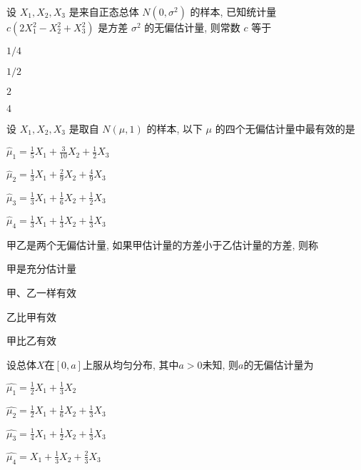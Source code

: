 \documentclass{exam-zh}
\begin{document}
\begin{question}
  设 $X_1, X_2, X_3$ 是来自正态总体 $N(0, \sigma^2)$ 的样本, 已知统计量 $c(2X_1^2 - X_2^2 + X_3^2)$ 是方差 $\sigma^2$ 的无偏估计量, 则常数 $c$ 等于 \paren[B]
  
  \begin{choices}
    \item $1/4$
    \item $1/2$
    \item $2$
    \item $4$
  \end{choices}
\end{question}

\begin{question}
  设 $X_1, X_2, X_3$ 是取自 $N(\mu, 1)$ 的样本, 以下 $\mu$ 的四个无偏估计量中最有效的是 \paren[D]
  
  \begin{choices}
    \item $\hat{\mu}_1 = \frac{1}{5}X_1 + \frac{3}{10}X_2 + \frac{1}{2}X_3$
    \item $\hat{\mu}_2 = \frac{1}{3}X_1 + \frac{2}{9}X_2 + \frac{4}{9}X_3$
    \item $\hat{\mu}_3 = \frac{1}{3}X_1 + \frac{1}{6}X_2 + \frac{1}{2}X_3$
    \item $\hat{\mu}_4 = \frac{1}{3}X_1 + \frac{1}{3}X_2 + \frac{1}{3}X_3$
  \end{choices}
\end{question}

\begin{question}
  甲乙是两个无偏估计量, 如果甲估计量的方差小于乙估计量的方差, 则称 \paren[D]
  
  \begin{choices}
    \item 甲是充分估计量
    \item 甲、乙一样有效
    \item 乙比甲有效
    \item 甲比乙有效
  \end{choices}
\end{question}

\begin{question}
  设总体$X$在$[0, a]$上服从均匀分布, 其中$a>0$未知, 则$a$的无偏估计量为 \paren[D]
  
  \begin{choices}
      \item $\hat{\mu_1} = \frac{1}{2}X_1 + \frac{1}{3}X_2$
      \item $\hat{\mu_2} = \frac{1}{2}X_1 + \frac{1}{6}X_2 + \frac{1}{3}X_3$
      \item $\hat{\mu_3} = \frac{1}{4}X_1 + \frac{1}{2}X_2 + \frac{1}{3}X_3$
      \item $\hat{\mu_4} = X_1 + \frac{1}{3}X_2 + \frac{2}{3}X_3$
  \end{choices}
\end{question}
\end{document}
